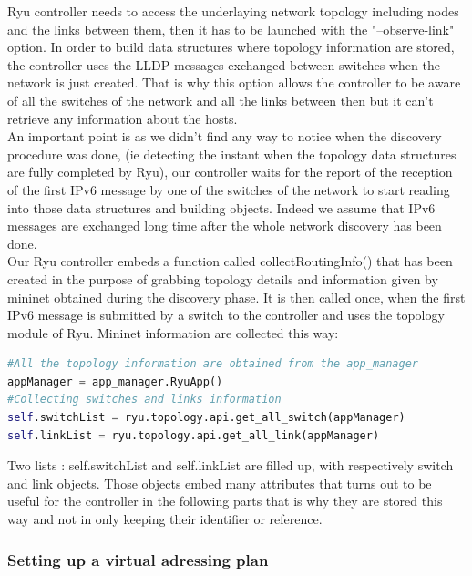 \documentclass{article}
\begin{document}
Ryu controller needs to access the underlaying network topology
including nodes and the links between them, then it has to be launched
with the "--observe-link" option. In order to build data structures
where topology information are stored, the controller uses the LLDP
messages exchanged between switches when the network is just
created. That is why this option allows the controller to be aware of
all the switches of the network and all the links between then but it
can't retrieve any information about the hosts.\\
\newline
An important point is as we didn't find any way to notice when the
discovery procedure was done, (ie detecting the instant when the
topology data structures are fully completed by Ryu), our controller
waits for the report of the reception of the first IPv6 message by one
of the switches of the network to start reading into those data
structures and building objects. Indeed we assume that IPv6 messages
are exchanged long time after the whole network discovery has been
done.\\
\newline
Our Ryu controller embeds a function called collectRoutingInfo() that
has been created in the purpose of grabbing topology details and
information given by mininet obtained during the discovery phase.  It
is then called once, when the first IPv6 message is submitted by a
switch to the controller and uses the topology module of Ryu. Mininet
information are collected this way:

\begin{lstlisting}[frame=single,language=Python,breaklines=true] 
#All the topology information are obtained from the app_manager
appManager = app_manager.RyuApp()
#Collecting switches and links information
self.switchList = ryu.topology.api.get_all_switch(appManager)
self.linkList = ryu.topology.api.get_all_link(appManager)
\end{lstlisting}

Two lists : self.switchList and self.linkList are filled up, with
respectively switch and link objects. Those objects embed many
attributes that turns out to be useful for the controller in the
following parts that is why they are stored this way and not in only
keeping their identifier or reference.

\subsubsection{Setting up a virtual adressing plan}
\end{document}
